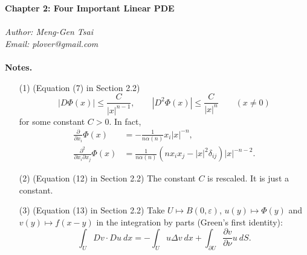 \documentclass{article}
\begin{document}
\textbf{\Large Chapter 2: Four Important Linear PDE} \\\\



\emph{Author: Meng-Gen Tsai} \\
\emph{Email: plover@gmail.com} \\\\









\textbf{Notes.}
\begin{enumerate}
\item[(1)]
  (Equation (7) in Section 2.2)
  \[
    |D\Phi(x)| \leq \frac{C}{|x|^{n-1}}, \qquad
    |D^2\Phi(x)| \leq \frac{C}{|x|^{n}} \qquad (x \neq 0)
  \]
  for some constant $C > 0$.
  In fact,
  \begin{align*}
  \frac{\partial}{\partial x_i}\Phi(x)
  &= -\frac{1}{n\alpha(n)} x_i |x|^{-n}, \\
  \frac{\partial^2}{\partial x_i \partial x_j}\Phi(x)
  &= \frac{1}{n\alpha(n)} (n x_i x_j - |x|^2 \delta_{ij}) |x|^{-n-2}.
  \end{align*}

\item[(2)]
  (Equation (12) in Section 2.2)
  The constant $C$ is rescaled.
  It is just a constant.

\item[(3)]
  (Equation (13) in Section 2.2)
  Take $U \mapsto B(0,\varepsilon)$, $u(y) \mapsto \Phi(y)$ and $v(y) \mapsto f(x-y)$
  in the integration by parts (Green's first identity):
  \[
    \int_{U} Dv \cdot Du \: dx
    = -\int_{U} u \Delta v \: dx
      + \int_{\partial U} \frac{\partial v}{\partial \nu} u \: dS.
  \]

\end{enumerate}



\end{document}
